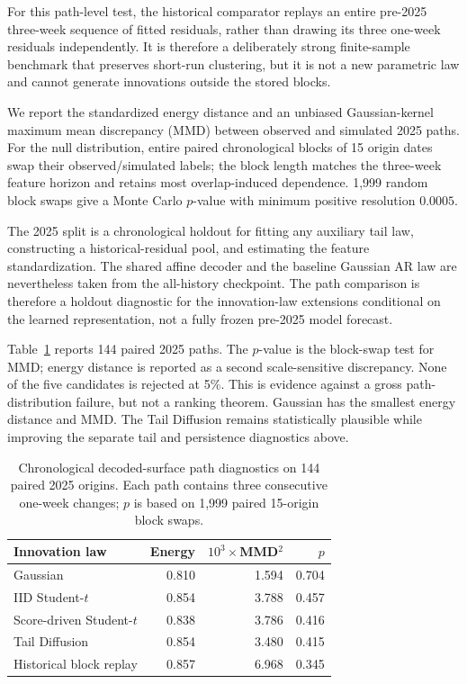 \documentclass[11pt,a4paper]{article}
\begin{document}
For this path-level test, the historical comparator replays an entire
pre-2025 three-week sequence of fitted residuals, rather than drawing its
three one-week residuals independently.  It is therefore a deliberately strong
finite-sample benchmark that preserves short-run clustering, but it is not a
new parametric law and cannot generate innovations outside the stored blocks.

We report the standardized energy distance and an unbiased Gaussian-kernel
maximum mean discrepancy (MMD) between observed and simulated 2025 paths.
For the null distribution, entire paired chronological blocks of 15 origin
dates swap their observed/simulated labels; the block length matches the
three-week feature horizon and retains most overlap-induced dependence.
1,999 random block swaps give a Monte Carlo $p$-value with minimum positive
resolution $0.0005$.

The 2025 split is a chronological holdout for fitting any auxiliary tail law,
constructing a historical-residual pool, and estimating the feature
standardization.  The shared affine decoder and the baseline Gaussian AR law
are nevertheless taken from the all-history checkpoint.  The path comparison
is therefore a holdout diagnostic for the innovation-law extensions
conditional on the learned representation, not a fully frozen pre-2025 model
forecast.

Table~\ref{tab:path-realism} reports 144 paired 2025 paths.
The $p$-value is the block-swap test for MMD; energy distance is reported as a
second scale-sensitive discrepancy.  None of the five candidates is rejected
at 5\%.  This is evidence against a gross path-distribution failure, but not a
ranking theorem.  Gaussian has the smallest energy distance and MMD.  The
Tail Diffusion remains statistically plausible while improving the
separate tail and persistence diagnostics above.

\begin{table}[H]
\centering
\small
\begin{tabular}{lrrr}
\toprule
Innovation law & Energy & $10^3\!\times$MMD$^2$ & $p$\\
\midrule
Gaussian & 0.810 & 1.594 & 0.704\\
IID Student-$t$ & 0.854 & 3.788 & 0.457\\
Score-driven Student-$t$ & 0.838 & 3.786 & 0.416\\
Tail Diffusion & 0.854 & 3.480 & 0.415\\
Historical block replay & 0.857 & 6.968 & 0.345\\
\bottomrule
\end{tabular}
\caption{Chronological decoded-surface path diagnostics on 144 paired 2025
origins.  Each path contains three consecutive one-week changes; $p$ is based
on 1,999 paired 15-origin block swaps.}
\label{tab:path-realism}
\end{table}
\end{document}

